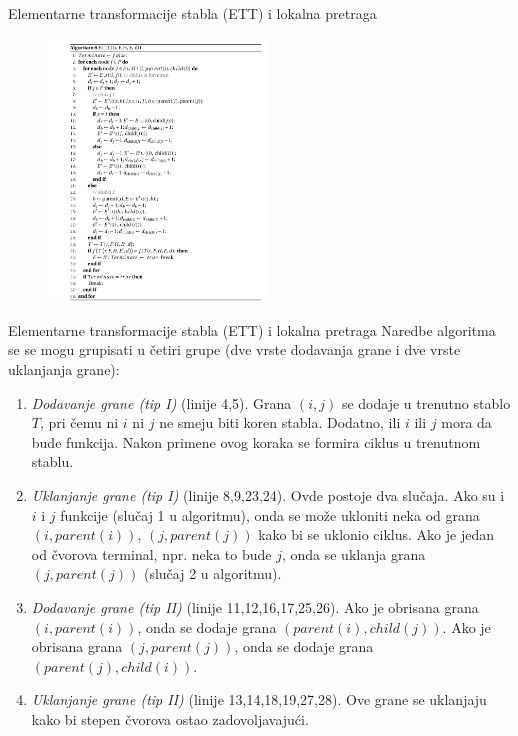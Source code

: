 \documentclass{beamer}
\begin{document}
\begin{frame}{Elementarne transformacije stabla (ETT) i lokalna pretraga}
\begin{figure}[!ht]
\begin{center}
\includegraphics[width=0.52\textwidth]{images/ett_alg.png}
\end{center}
\end{figure}

\end{frame}

\begin{frame}{Elementarne transformacije stabla (ETT) i lokalna pretraga}
\scriptsize
Naredbe algoritma se se mogu grupisati u četiri grupe (dve vrste dodavanja grane i dve vrste uklanjanja grane):
\begin{enumerate}
    \item \textit{Dodavanje grane (tip I)} (linije 4,5). Grana $(i,j)$ se dodaje u trenutno stablo $T$, pri čemu ni $i$ ni $j$ ne smeju biti koren stabla. Dodatno, ili $i$ ili $j$ mora da bude funkcija. Nakon primene ovog koraka se formira ciklus u trenutnom stablu.
    \item \textit{Uklanjanje grane (tip I)} (linije 8,9,23,24). Ovde postoje dva slučaja. Ako su i $i$ i $j$ funkcije (slučaj 1 u algoritmu), onda se može ukloniti neka od grana $(i, parent(i))$, $(j, parent(j))$ kako bi se uklonio ciklus. Ako je jedan od čvorova terminal, npr. neka to bude $j$, onda se uklanja grana $(j, parent(j))$ (slučaj 2 u algoritmu).
    \item \textit{Dodavanje grane (tip II)} (linije 11,12,16,17,25,26). Ako je obrisana grana $(i, parent(i))$, onda se dodaje grana $(parent(i), child(j))$. Ako je obrisana grana $(j, parent(j))$, onda se dodaje grana $(parent(j), child(i))$. 
    \item \textit{Uklanjanje grane (tip II)} (linije 13,14,18,19,27,28). Ove grane se uklanjaju kako bi stepen čvorova ostao zadovoljavajući. 
\end{enumerate}
\end{frame}
\end{document}
